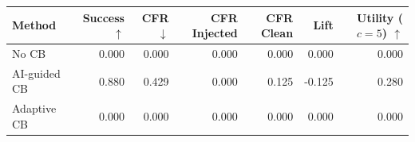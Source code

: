\begin{tabular}{lrrrrrr}
\toprule
Method & Success $\uparrow$ & CFR $\downarrow$ & CFR Injected & CFR Clean & Lift & Utility ($c=5$) $\uparrow$ \\
\midrule
No CB & 0.000 & 0.000 & 0.000 & 0.000 & 0.000 & 0.000 \\
AI-guided CB & 0.880 & 0.429 & 0.000 & 0.125 & -0.125 & 0.280 \\
Adaptive CB & 0.000 & 0.000 & 0.000 & 0.000 & 0.000 & 0.000 \\
\bottomrule
\end{tabular}
